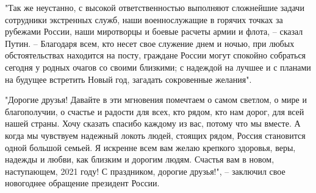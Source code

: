 "Так же неустанно, с высокой ответственностью выполняют сложнейшие задачи
сотрудники экстренных служб, наши военнослужащие в горячих точках за рубежами
России, наши миротворцы и боевые расчеты армии и флота, – сказал Путин. –
Благодаря всем, кто несет свое служение днем и ночью, при любых обстоятельствах
находится на посту, граждане России могут спокойно собраться сегодня у родных
очагов со своими близкими; с надеждой на лучшее и с планами на будущее
встретить Новый год, загадать сокровенные желания".

"Дорогие друзья! Давайте в эти мгновения помечтаем о самом светлом, о мире и
благополучии, о счастье и радости для всех, кто рядом, кто нам дорог, для всей
нашей страны. Хочу сказать спасибо каждому из вас, потому что мы вместе. А
когда мы чувствуем надежный локоть людей, стоящих рядом, Россия становится
одной большой семьей. Я искренне всем вам желаю крепкого здоровья, веры,
надежды и любви, как близким и дорогим людям. Счастья вам в новом, наступающем,
2021 году! С праздником, дорогие друзья!", – заключил свое новогоднее обращение
президент России.


